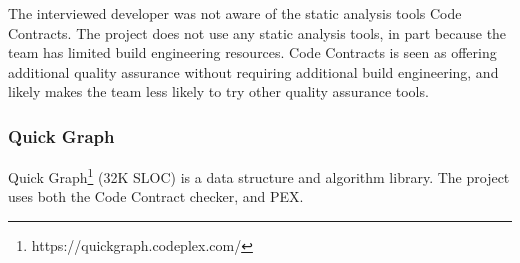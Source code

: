 The interviewed developer was not aware of the static analysis tools
Code Contracts. The project does not use any static analysis tools, in
part because the team has limited build engineering resources. Code
Contracts is seen as offering additional quality assurance without
requiring additional build engineering, and likely makes the team less
likely to try other quality assurance tools.

\subsubsection{Quick Graph}

Quick Graph\footnote{https://quickgraph.codeplex.com/} (32K SLOC) is
a data structure and algorithm library. The project uses both the Code
Contract checker, and PEX.

